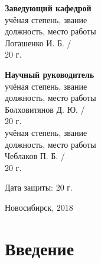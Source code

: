 \documentclass[14pt,russian,a4paper]{extarticle}
\begin{document}
{\noindent
\begin{minipage}[t]{70mm}
    \begin{center}
    {\bf Заведующий кафедрой} \\
    учёная степень, звание \\
    должность, место работы \\
    Логашенко И. Б. / \makebox[20mm]{\dotfill} \\
    \guillemotleft\makebox[10mm]{\dotfill}\guillemotright \makebox[30mm]{\dotfill} 20\makebox[5mm]{\dotfill} г.
    \end{center}
\end{minipage}
\hfill
\begin{minipage}[t]{70mm}
    \begin{center}
    {\bf Научный руководитель} \\
    учёная степень, звание \\
    должность, место работы \\
    Болховитянов Д. Ю. / \makebox[20mm]{\dotfill} \\
    \guillemotleft\makebox[10mm]{\dotfill}\guillemotright \makebox[30mm]{\dotfill} 20\makebox[5mm]{\dotfill} г. \\
    учёная степень, звание \\
    должность, место работы \\
    Чеблаков П. Б. / \makebox[20mm]{\dotfill} \\
    \guillemotleft\makebox[10mm]{\dotfill}\guillemotright \makebox[30mm]{\dotfill} 20\makebox[5mm]{\dotfill} г.
    \end{center}
\end{minipage}

\vspace{4mm}

\begin{flushright}
    Дата защиты: \guillemotleft\makebox[10mm]{\dotfill}\guillemotright \makebox[30mm]{\dotfill} 20\makebox[5mm]{\dotfill} г.
\end{flushright}

\vfill

\centerline{Новосибирск, 2018}
}

\newpage
\thispagestyle{empty}
\tableofcontents
\newpage

\section{Введение}
\end{document}
